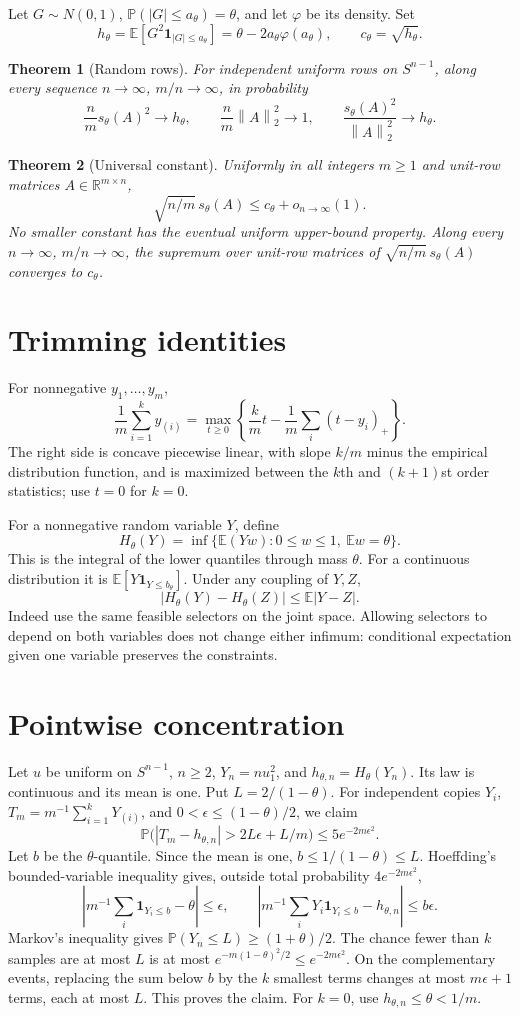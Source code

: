 \documentclass[11pt]{article}
\newtheorem{theorem}{Theorem}
\newcommand{\R}{\mathbb R}
\newcommand{\norm}[1]{\left\lVert#1\right\rVert}
\newcommand{\E}{\mathbb E}
\newcommand{\Prob}{\mathbb P}
\begin{document}
Let $G\sim N(0,1)$, $\Prob(|G|\le a_\theta)=\theta$, and let $\varphi$ be its density. Set
\[
h_\theta=\E[G^2\mathbf1_{|G|\le a_\theta}]=\theta-2a_\theta\varphi(a_\theta),\qquad c_\theta=\sqrt{h_\theta}.
\]
\begin{theorem}[Random rows]
For independent uniform rows on $S^{n-1}$, along every sequence $n\to\infty$, $m/n\to\infty$, in probability
\[
\frac nm s_\theta(A)^2\to h_\theta,\qquad \frac nm\norm A_2^2\to1,\qquad
\frac{s_\theta(A)^2}{\norm A_2^2}\to h_\theta.
\]
\end{theorem}
\begin{theorem}[Universal constant]
Uniformly in all integers $m\ge1$ and unit-row matrices $A\in\R^{m\times n}$,
\[\sqrt{n/m}\,s_\theta(A)\le c_\theta+o_{n\to\infty}(1).\]
No smaller constant has the eventual uniform upper-bound property. Along every $n\to\infty$, $m/n\to\infty$, the supremum over unit-row matrices of $\sqrt{n/m}\,s_\theta(A)$ converges to $c_\theta$.
\end{theorem}
\section{Trimming identities}
For nonnegative $y_1,\ldots,y_m$,
\[
\frac1m\sum_{i=1}^k y_{(i)}=\max_{t\ge0}\left\{\frac km t-\frac1m\sum_i(t-y_i)_+\right\}.
\]
The right side is concave piecewise linear, with slope $k/m$ minus the empirical distribution function, and is maximized between the $k$th and $(k+1)$st order statistics; use $t=0$ for $k=0$.

For a nonnegative random variable $Y$, define
\[
H_\theta(Y)=\inf\{\E(Yw):0\le w\le1,\ \E w=\theta\}.
\]
This is the integral of the lower quantiles through mass $\theta$. For a continuous distribution it is $\E[Y\mathbf1_{Y\le b_\theta}]$. Under any coupling of $Y,Z$,
\[|H_\theta(Y)-H_\theta(Z)|\le\E|Y-Z|.\]
Indeed use the same feasible selectors on the joint space. Allowing selectors to depend on both variables does not change either infimum: conditional expectation given one variable preserves the constraints.
\section{Pointwise concentration}
Let $u$ be uniform on $S^{n-1}$, $n\ge2$, $Y_n=nu_1^2$, and $h_{\theta,n}=H_\theta(Y_n)$. Its law is continuous and its mean is one. Put $L=2/(1-\theta)$. For independent copies $Y_i$, $T_m=m^{-1}\sum_{i=1}^kY_{(i)}$, and $0<\epsilon\le(1-\theta)/2$, we claim
\[
\Prob\bigl(|T_m-h_{\theta,n}|>2L\epsilon+L/m\bigr)\le5e^{-2m\epsilon^2}.
\]
Let $b$ be the $\theta$-quantile. Since the mean is one, $b\le1/(1-\theta)\le L$. Hoeffding's bounded-variable inequality gives, outside total probability $4e^{-2m\epsilon^2}$,
\[
\left|m^{-1}\sum_i\mathbf1_{Y_i\le b}-\theta\right|\le\epsilon,\qquad
\left|m^{-1}\sum_iY_i\mathbf1_{Y_i\le b}-h_{\theta,n}\right|\le b\epsilon.
\]
Markov's inequality gives $\Prob(Y_n\le L)\ge(1+\theta)/2$. The chance fewer than $k$ samples are at most $L$ is at most $e^{-m(1-\theta)^2/2}\le e^{-2m\epsilon^2}$. On the complementary events, replacing the sum below $b$ by the $k$ smallest terms changes at most $m\epsilon+1$ terms, each at most $L$. This proves the claim. For $k=0$, use $h_{\theta,n}\le\theta<1/m$.
\end{document}
